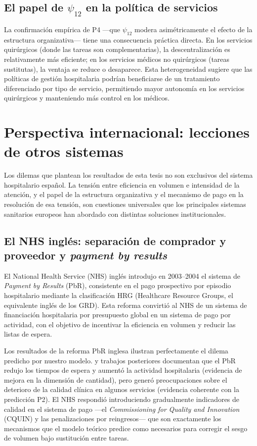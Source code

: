 \documentclass[12pt, a4paper, twoside, openright]{book}
\theoremstyle{plain}
\theoremstyle{definition}
\theoremstyle{remark}
\begin{document}
\subsection{El papel de \texorpdfstring{$\psi_{12}$}{psi\_12} en la política de servicios}

La confirmación empírica de P4 ---que $\psi_{12}$ modera asimétricamente el efecto de la estructura organizativa--- tiene una consecuencia práctica directa. En los servicios quirúrgicos (donde las tareas son complementarias), la descentralización es relativamente más eficiente; en los servicios médicos no quirúrgicos (tareas sustitutas), la ventaja se reduce o desaparece. Esta heterogeneidad sugiere que las políticas de gestión hospitalaria podrían beneficiarse de un tratamiento diferenciado por tipo de servicio, permitiendo mayor autonomía en los servicios quirúrgicos y manteniendo más control en los médicos.

\section{Perspectiva internacional: lecciones de otros sistemas}
\label{sec:perspectiva_internacional}

Los dilemas que plantean los resultados de esta tesis no son exclusivos del sistema hospitalario español. La tensión entre eficiencia en volumen e intensidad de la atención, y el papel de la estructura organizativa y el mecanismo de pago en la resolución de esa tensión, son cuestiones universales que los principales sistemas sanitarios europeos han abordado con distintas soluciones institucionales.

\subsection{El NHS inglés: separación de comprador y proveedor y \textit{payment by results}}

El National Health Service (NHS) inglés introdujo en 2003--2004 el sistema de \textit{Payment by Results} (PbR), consistente en el pago prospectivo por episodio hospitalario mediante la clasificación HRG (Healthcare Resource Groups, el equivalente inglés de los GRD). Esta reforma convirtió al NHS de un sistema de financiación hospitalaria por presupuesto global en un sistema de pago por actividad, con el objetivo de incentivar la eficiencia en volumen y reducir las listas de espera.

Los resultados de la reforma PbR inglesa ilustran perfectamente el dilema predicho por nuestro modelo. \citet{street2003} y trabajos posteriores documentan que el PbR redujo los tiempos de espera y aumentó la actividad hospitalaria (evidencia de mejora en la dimensión de cantidad), pero generó preocupaciones sobre el deterioro de la calidad clínica en algunos servicios (evidencia coherente con la predicción P2). El NHS respondió introduciendo gradualmente indicadores de calidad en el sistema de pago ---el \textit{Commissioning for Quality and Innovation} (CQUIN) y las penalizaciones por reingresos--- que son exactamente los mecanismos que el modelo teórico predice como necesarios para corregir el sesgo de volumen bajo sustitución entre tareas.
\end{document}
